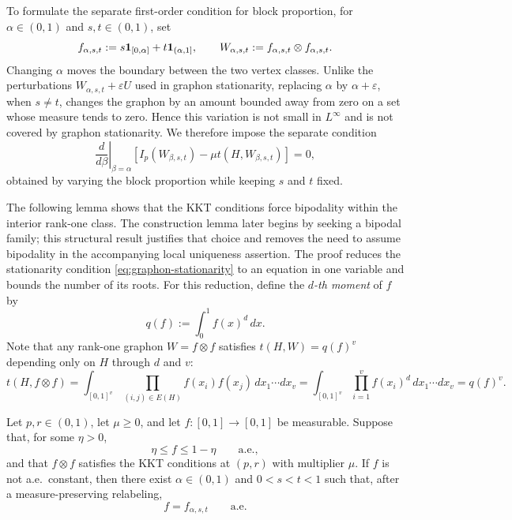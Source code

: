 To formulate the separate first-order condition for block proportion,
for $\alpha\in(0,1)$ and $s,t\in(0,1)$, set
\[
  f_{\alpha,s,t}
  :=s\mathbf 1_{[0,\alpha]}+t\mathbf 1_{(\alpha,1]},
  \qquad
  W_{\alpha,s,t}:=f_{\alpha,s,t}\otimes f_{\alpha,s,t}.
\]
Changing $\alpha$ moves the boundary between the two vertex classes.  Unlike
the perturbations $W_{\alpha,s,t}+\varepsilon U$ used in graphon stationarity,
replacing $\alpha$ by $\alpha+\varepsilon$, when $s\ne t$, changes the graphon
by an amount bounded away from zero on a set whose measure tends to zero.
Hence this variation is not small in $L^\infty$ and is not covered by graphon
stationarity.  We therefore impose the separate condition
\begin{equation}\label{eq:block-stationarity}
  \left.\frac{d}{d\beta}\right|_{\beta=\alpha}
  \left[
    I_p(W_{\beta,s,t})-\mu t(H,W_{\beta,s,t})
  \right]=0,
\end{equation}
obtained by varying the block proportion while keeping $s$ and $t$ fixed.

The following lemma shows that the KKT conditions force bipodality
within the interior rank-one class.  The
construction lemma later begins by seeking a bipodal family; this structural
result justifies that choice and removes the need to assume bipodality in
the accompanying local uniqueness assertion.  The proof reduces the stationarity condition
\eqref{eq:graphon-stationarity} to an equation in one variable and bounds the
number of its roots.  For this reduction, define the \emph{$d$-th moment} of
$f$ by
\[
  q(f):=\int_0^1 f(x)^d\,dx.
\]
Note that any rank-one graphon $W=f\otimes f$ satisfies
$t(H,W)=q(f)^v$ depending only on $H$ through $d$ and $v$:
\[
  t(H,f\otimes f)
  =\int_{[0,1]^v}\prod_{(i,j)\in E(H)}f(x_i)f(x_j)\,dx_1\cdots dx_v
  =\int_{[0,1]^v}\prod_{i=1}^v f(x_i)^{d}\,dx_1\cdots dx_v
  =q(f)^v.
\]

\begin{lemma}
\label{lem:stationary-rank-one-bipodality}
Let $p,r\in(0,1)$, let $\mu\ge0$, and let
$f:[0,1]\to[0,1]$ be measurable.  Suppose that, for some $\eta>0$,
\[
  \eta\le f\le1-\eta
  \qquad\text{a.e.},
\]
and that $f\otimes f$ satisfies the KKT conditions at $(p,r)$ with multiplier
$\mu$.  If $f$ is not a.e.\ constant, then there exist $\alpha\in(0,1)$ and
$0<s<t<1$ such that, after a measure-preserving relabeling,
\[
  f=f_{\alpha,s,t}
  \qquad\text{a.e.}
\]
\end{lemma}

